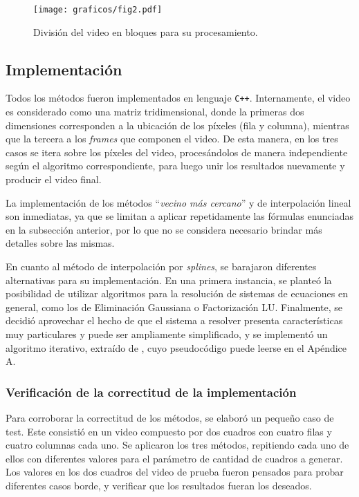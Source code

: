        \begin{figure}[h]
          \centering

          \texttt{[image: graficos/fig2.pdf]} \vspace{1em} \\

          \caption{División del video en bloques para su procesamiento.}
          \label{fig:spline-bloques}
        \end{figure}


  \subsection{Implementación}

    Todos los métodos fueron implementados en lenguaje \texttt{C++}. Internamente, el video es considerado como una matriz tridimensional, donde la primeras dos dimensiones corresponden a la ubicación de los píxeles (fila y columna), mientras que la tercera a los \emph{frames} que componen el video. De esta manera, en los tres casos se itera sobre los píxeles del video, procesándolos de manera independiente según el algoritmo correspondiente, para luego unir los resultados nuevamente y producir el video final.

    La implementación de los métodos ``\emph{vecino más cercano}'' y de interpolación lineal son inmediatas, ya que se limitan a aplicar repetidamente las fórmulas enunciadas en la subsección anterior, por lo que no se considera necesario brindar más detalles sobre las mismas.

    En cuanto al método de interpolación por \emph{splines}, se barajaron diferentes alternativas para su implementación. En una primera instancia, se planteó la posibilidad de utilizar algoritmos para la resolución de sistemas de ecuaciones en general, como los de Eliminación Gaussiana o Factorización LU. Finalmente, se decidió aprovechar el hecho de que el sistema a resolver presenta características muy particulares y puede ser ampliamente simplificado, y se implementó un algoritmo iterativo, extraído de \cite[Algoritmo 3.4]{Burden}, cuyo pseudocódigo puede leerse en el Apéndice A.

    \subsubsection{Verificación de la correctitud de la implementación}

    Para corroborar la correctitud de los métodos, se elaboró un pequeño caso de test. Este consistió en un video compuesto por dos cuadros con cuatro filas y cuatro columnas cada uno. Se aplicaron los tres métodos, repitiendo cada uno de ellos con diferentes valores para el parámetro de cantidad de cuadros a generar. Los valores en los dos cuadros del video de prueba fueron pensados para probar diferentes casos borde, y verificar que los resultados fueran los deseados.

